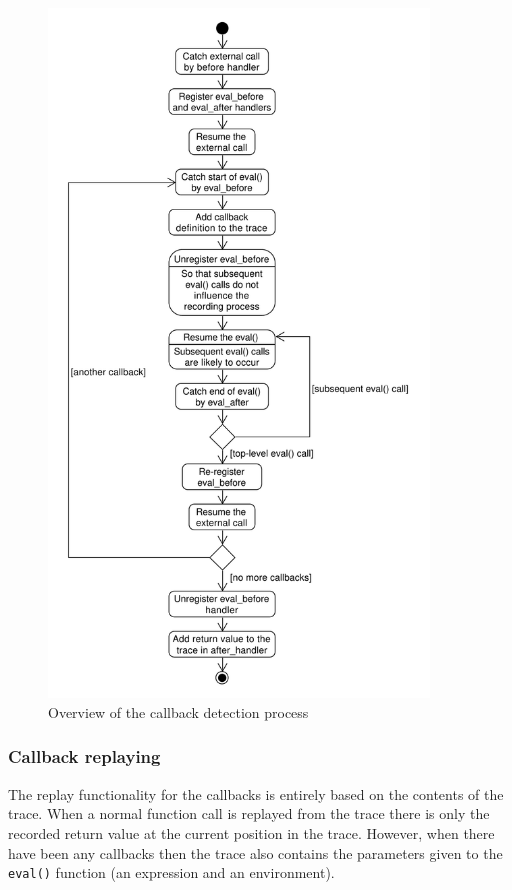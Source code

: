 \documentclass[thesis=M,english,hidelinks]{FITthesis}[2012/10/20]
\begin{document}
			\begin{figure}[ht]\centering
				\setlength{\abovecaptionskip}{-10pt}
				\includegraphics[width=0.9\textwidth]{img/callbacks3}
				\caption{Overview of the callback detection process}\label{fig:callbacks3}
			\end{figure}
			\FloatBarrier
			
			\subsubsection{Callback replaying}
			The replay functionality for the callbacks is entirely based on the contents of the trace. When a normal function call is replayed from the trace there is only the recorded return value at the current position in the trace. However, when there have been any callbacks then the trace also contains the parameters given to the \lstinline|eval()| function (an expression and an environment).\par
			
\end{document}
